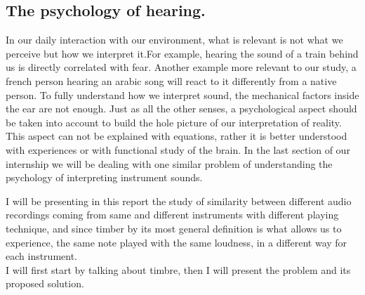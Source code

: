 \documentclass[hidelinks,12pt]{report}
\begin{document}
\subsection{The psychology of hearing.}

In our daily interaction with our environment, what is relevant is not what we perceive but how we interpret it.For example, hearing the sound of a train behind us is directly correlated with fear. Another example more relevant to our study, a french person hearing an arabic song will react to it differently from a native person. To fully understand how we interpret sound, the mechanical factors inside the ear are not enough. Just as all the other senses, a psychological aspect should be taken into account to build the hole picture of our interpretation of reality. This aspect can not be explained with equations, rather it is better understood with experiences or with functional study of the brain. In the last section of our internship we will be dealing with one similar problem of understanding the psychology of interpreting instrument sounds.\par 


I will be presenting in this report the study of similarity between different audio recordings coming from same and different instruments with different playing technique, and since timber by its most general definition is what allows us to experience, the same note played with the same loudness, in a different way for each instrument.\\ I will first start by talking about  timbre, then I will present the problem and its proposed solution. 
\end{document}
